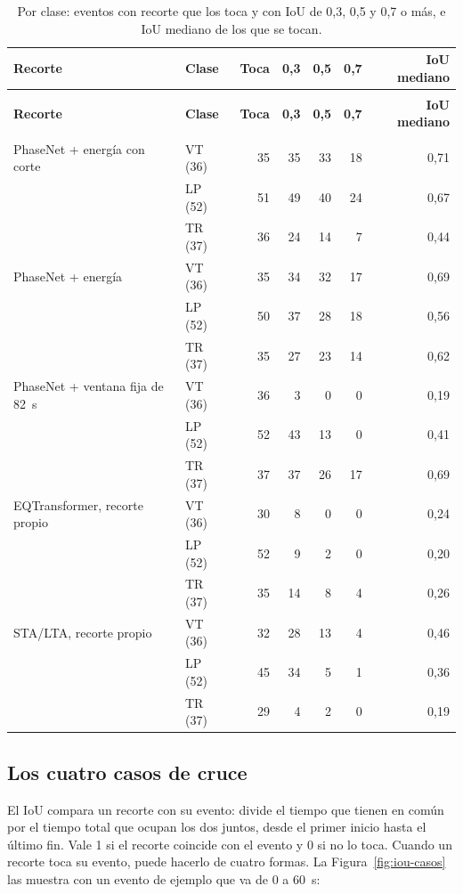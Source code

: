 \documentclass[11pt,a4paper,oneside,spanish,oldfontcommands]{memoir}
\newcommand{\cabecera}[2]{%
  \toprule #1 \\ \midrule \endfirsthead
  \multicolumn{#2}{l}{\itshape Cuadro \thetable{} (continuación)}\\
  \toprule #1 \\ \midrule \endhead
  \midrule \multicolumn{#2}{r}{\itshape Continúa en la página siguiente}\\ \endfoot
  \bottomrule \endlastfoot}
\begin{document}
{\small
\setlength{\tabcolsep}{4pt}
\begin{longtable}{>{\raggedright\arraybackslash}p{5.2cm}lrrrrr}
\caption{Por clase: eventos con recorte que los toca y con IoU de 0,3, 0,5 y 0,7 o más, e IoU mediano de los que se tocan.}\label{tab:iou-clase}\\
\cabecera{\textbf{Recorte} & \textbf{Clase} & \textbf{Toca} & \textbf{0,3} & \textbf{0,5} & \textbf{0,7} & \textbf{IoU mediano}}{7}
PhaseNet + energía con corte & VT (36) & 35 & 35 & 33 & 18 & 0,71 \\
 & LP (52) & 51 & 49 & 40 & 24 & 0,67 \\
 & TR (37) & 36 & 24 & 14 & 7 & 0,44 \\
\midrule
PhaseNet + energía & VT (36) & 35 & 34 & 32 & 17 & 0,69 \\
 & LP (52) & 50 & 37 & 28 & 18 & 0,56 \\
 & TR (37) & 35 & 27 & 23 & 14 & 0,62 \\
\midrule
PhaseNet + ventana fija de 82~s & VT (36) & 36 & 3 & 0 & 0 & 0,19 \\
 & LP (52) & 52 & 43 & 13 & 0 & 0,41 \\
 & TR (37) & 37 & 37 & 26 & 17 & 0,69 \\
\midrule
EQTransformer, recorte propio & VT (36) & 30 & 8 & 0 & 0 & 0,24 \\
 & LP (52) & 52 & 9 & 2 & 0 & 0,20 \\
 & TR (37) & 35 & 14 & 8 & 4 & 0,26 \\
\midrule
STA/LTA, recorte propio & VT (36) & 32 & 28 & 13 & 4 & 0,46 \\
 & LP (52) & 45 & 34 & 5 & 1 & 0,36 \\
 & TR (37) & 29 & 4 & 2 & 0 & 0,19 \\
\end{longtable}
}

\subsection*{Los cuatro casos de cruce}

El IoU compara un recorte con su evento: divide el tiempo que tienen en común
por el tiempo total que ocupan los dos juntos, desde el primer inicio hasta el
último fin. Vale 1 si el recorte coincide con el evento y 0 si no lo toca.
Cuando un recorte toca su evento, puede hacerlo de cuatro formas. La
Figura~\ref{fig:iou-casos} las muestra con un evento de ejemplo que va de 0 a
60~s:
\end{document}
